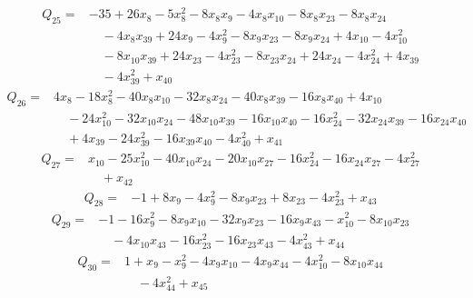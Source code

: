 \begin{equation*}\begin{split}
Q_{25}={}&-35 + 26x_{8} - 5x_{8}^{2} - 8x_{8} x_{9} - 4x_{8} x_{10} - 8x_{8} x_{23} - 8x_{8} x_{24}\\
&\quad -4x_{8} x_{39} + 24x_{9} - 4x_{9}^{2} - 8x_{9} x_{23} - 8x_{9} x_{24} + 4x_{10} - 4x_{10}^{2}\\
&\quad -8x_{10} x_{39} + 24x_{23} - 4x_{23}^{2} - 8x_{23} x_{24} + 24x_{24} - 4x_{24}^{2} + 4x_{39}\\
&\quad -4x_{39}^{2} + x_{40}
\end{split}\end{equation*}
\begin{equation*}\begin{split}
Q_{26}={}&4x_{8} - 18x_{8}^{2} - 40x_{8} x_{10} - 32x_{8} x_{24} - 40x_{8} x_{39} - 16x_{8} x_{40} + 4x_{10}\\
&\quad -24x_{10}^{2} - 32x_{10} x_{24} - 48x_{10} x_{39} - 16x_{10} x_{40} - 16x_{24}^{2} - 32x_{24} x_{39} - 16x_{24} x_{40}\\
&\quad + 4x_{39} - 24x_{39}^{2} - 16x_{39} x_{40} - 4x_{40}^{2} + x_{41}
\end{split}\end{equation*}
\begin{equation*}\begin{split}
Q_{27}={}&x_{10} - 25x_{10}^{2} - 40x_{10} x_{24} - 20x_{10} x_{27} - 16x_{24}^{2} - 16x_{24} x_{27} - 4x_{27}^{2}\\
&\quad + x_{42}
\end{split}\end{equation*}
\begin{equation*}\begin{split}
Q_{28}={}&-1 + 8x_{9} - 4x_{9}^{2} - 8x_{9} x_{23} + 8x_{23} - 4x_{23}^{2} + x_{43}
\end{split}\end{equation*}
\begin{equation*}\begin{split}
Q_{29}={}&-1 - 16x_{9}^{2} - 8x_{9} x_{10} - 32x_{9} x_{23} - 16x_{9} x_{43} - x_{10}^{2} - 8x_{10} x_{23}\\
&\quad -4x_{10} x_{43} - 16x_{23}^{2} - 16x_{23} x_{43} - 4x_{43}^{2} + x_{44}
\end{split}\end{equation*}
\begin{equation*}\begin{split}
Q_{30}={}&1 + x_{9} - x_{9}^{2} - 4x_{9} x_{10} - 4x_{9} x_{44} - 4x_{10}^{2} - 8x_{10} x_{44}\\
&\quad -4x_{44}^{2} + x_{45}
\end{split}\end{equation*}
